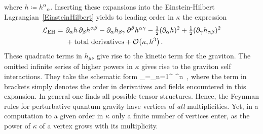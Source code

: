 %
where $h \coloneqq h^{\alpha}{}_{\alpha}$.
Inserting these expansions into the Einstein-Hilbert Lagrangian~\eqref{EinsteinHilbert} yields to leading order in
$\kappa$ the expression 
%
\begin{align} 
\label{LEHquadr}
\begin{aligned}
\mathcal{L}_{\text{EH}} = \ & \partial_{\alpha}h \, \partial_{\beta}h^{\alpha\beta}
- \partial_{\alpha}h_{\beta\gamma}\, \partial^{\beta}h^{\alpha\gamma} - {\textstyle\frac{1}{2}}(\partial_{\alpha}h)^{2} +{\textstyle\frac{1}{2}} (\partial_{\gamma}h_{\alpha\beta})^{2} \\ 
& + \text{total derivatives} +\mathcal{O}\bigl(\kappa, h^{3} \bigr) \,.
\end{aligned}
\end{align}
%
These quadratic terms in $h_{\mu\nu}$ give rise to the kinetic term for the graviton. The omitted infinite series of higher powers
in $\kappa$ gives rise to the graviton self interactions. They take the schematic form 
%
\be
{}_{}=\sum_{n=1}^{\infty} \kappa^{n}  \,,
\ee
%
where the term in brackets simply denotes the order in derivatives and fields encountered
in this expansion. In general one finds
all possible tensor structures. Hence, the Feynman rules for perturbative quantum gravity have vertices  of \emph{all} multiplicities.
Yet, in a computation to a given order in $\kappa$ only a finite number of vertices enter,
as the power of $\kappa$ of a vertex grows with its multiplicity.

